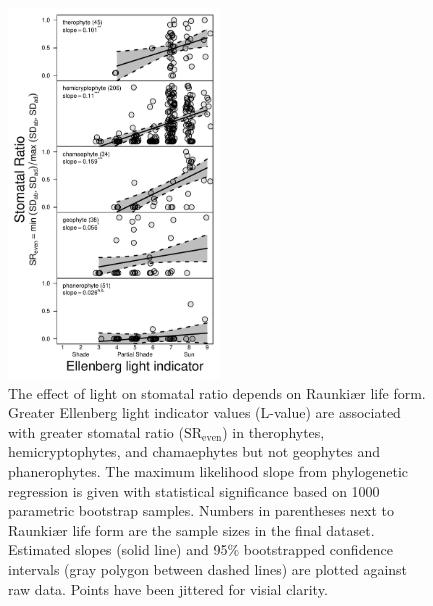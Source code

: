 \documentclass[12pt, oneside]{article}
\newcommand{\el}{L-value}
\begin{document}
\begin{figure}[ht]
\centerline{\includegraphics[width=0.5\textwidth]{Figures/Figure_SRmultReg.pdf}}
\caption{The effect of light on stomatal ratio depends on Raunki\ae r life form. Greater Ellenberg light indicator values (\el) are associated with greater stomatal ratio ($\mathrm{SR_{even}}$) in therophytes, hemicryptophytes, and chamaephytes but not geophytes and phanerophytes. The maximum likelihood slope from phylogenetic regression is given with statistical significance based on 1000 parametric bootstrap samples. Numbers in parentheses next to Raunki\ae r life form are the sample sizes in the final dataset. Estimated slopes (solid line) and 95\% bootstrapped confidence intervals (gray polygon between dashed lines) are plotted against raw data. Points have been jittered for visial clarity.} 
\label{fig:SRmultReg}
\end{figure}
\end{document}

